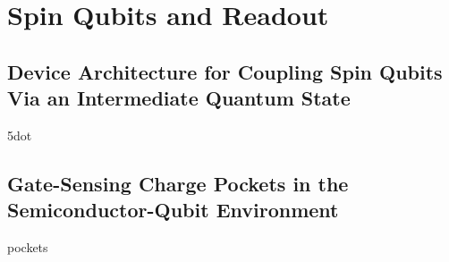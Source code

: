 \chapter{Spin Qubits and Readout}

\clearpage
\section{Device Architecture for Coupling Spin Qubits Via an Intermediate Quantum State}
\label{sec:5dot}
{5dot}

\clearpage
\section{Gate-Sensing Charge Pockets in the Semiconductor-Qubit Environment}
{pockets}